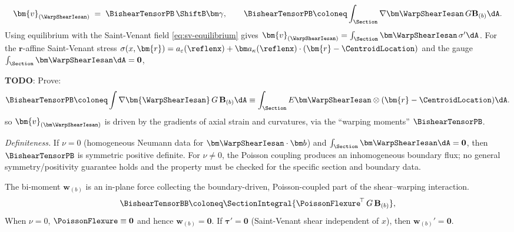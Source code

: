 \begin{equation}
\bm{v}_{(\WarpShearIesan)} \;=\; \BishearTensorPB\,\ShiftB\bm\gamma,
\qquad
\BishearTensorPB \coloneq \int_{\Section} \nabla\bm\WarpShearIesan \,G\mathbf{B}_{(b)} \dA.
\label{eq:bishear-psi-tensor}
\end{equation}
%
Using equilibrium with the Saint-Venant field \eqref{eq:sv-equilibrium} gives
$\bm{v}_{(\WarpShearIesan)}=\int_{\Section}\bm\WarpShearIesan\,\sigma'\dA$.
For the $\bm{r}$-affine Saint-Venant stress
$\sigma(x,\bm{r})=a_{\varepsilon}(\reflenx)+\bm a_\kappa(\reflenx)\cdot(\bm{r}-\CentroidLocation)$
and the gauge $\int_{\Section}\bm\WarpShearIesan\dA=\mathbf{0}$,

\textbf{TODO}: Prove:
\begin{equation*}
  \BishearTensorPB \coloneq \int\nabla\bm{\WarpShearIesan}\,G\,\mathbf{B}_{(b)}\dA
  \equiv \int_{\Section}E \bm\WarpShearIesan \otimes(\bm{r}-\CentroidLocation)\dA.
\end{equation*}
so \(\bm{v}_{(\bm\WarpShearIesan)}\) is driven by the gradients of axial strain and curvatures, via the ``warping moments'' \(\BishearTensorPB\).
\begin{remark}
\emph{Definiteness.}
If $\nu=0$ (homogeneous Neumann data for $\bm\WarpShearIesan\cdot\bm b$) and $\int_{\Section}\bm\WarpShearIesan\dA=\mathbf{0}$, then $\BishearTensorPB$ is symmetric positive definite.
For $\nu\neq 0$, the Poisson coupling produces an inhomogeneous boundary flux; no general symmetry/positivity guarantee holds and the property must be checked for the specific section and boundary data.
\end{remark}

The bi-moment $\bm{w}_{(b)}$ is an in-plane force collecting the boundary-driven, Poisson-coupled part of the shear–warping interaction. 
\begin{equation}
\BishearTensorBB \coloneq \SectionIntegral{\PoissonFlexure^{\!\top}\,G\,\mathbf{B}_{(b)}},
\label{eq:bishear-b-tensor}
\end{equation}
When $\nu=0$, $\PoissonFlexure\equiv\mathbf{0}$ and hence $\bm{w}_{(b)}=\mathbf{0}$. 
If $\bm\tau'=\mathbf{0}$ (Saint-Venant shear independent of $x$), then $\bm{w}_{(b)}'=\mathbf{0}$.

